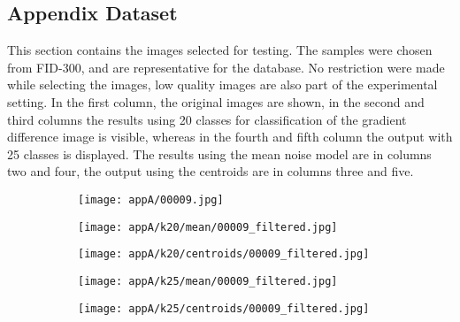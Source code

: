 \documentclass[draft,final]{vutinfth} %
\begin{document}
\begin{appendices}
		\chapter{Appendix Dataset}
		\label{AppA}
		This section contains the images selected for testing.
		The samples were chosen from FID-300, and are representative for the database.
No restriction were made while selecting the images, low quality images are also part of the experimental setting.
		In the first column, the original images are shown, in the second and third columns the results using 20 classes for classification of the gradient difference image is visible, whereas in the fourth and fifth column the output with 25 classes is displayed.
		The results using the mean noise model are in columns two and four, the output using the centroids are in columns three and five.
\begin{figure}[h]
\centering
  \begin{subfigure}[t]{0.19\columnwidth}
    \centering
    \texttt{[image: appA/00009.jpg]}
  \end{subfigure}
  \begin{subfigure}[t]{0.19\columnwidth}
    \centering
    \texttt{[image: appA/k20/mean/00009\_filtered.jpg]}
  \end{subfigure}
  \begin{subfigure}[t]{0.19\columnwidth}
    \centering
    \texttt{[image: appA/k20/centroids/00009\_filtered.jpg]}
  \end{subfigure}
  \begin{subfigure}[t]{0.19\columnwidth}
    \centering
    \texttt{[image: appA/k25/mean/00009\_filtered.jpg]}
  \end{subfigure}
  \begin{subfigure}[t]{0.19\columnwidth}
    \centering
    \texttt{[image: appA/k25/centroids/00009\_filtered.jpg]}
  \end{subfigure}
\caption{}
\end{figure}  


\end{appendices}
\end{document}

